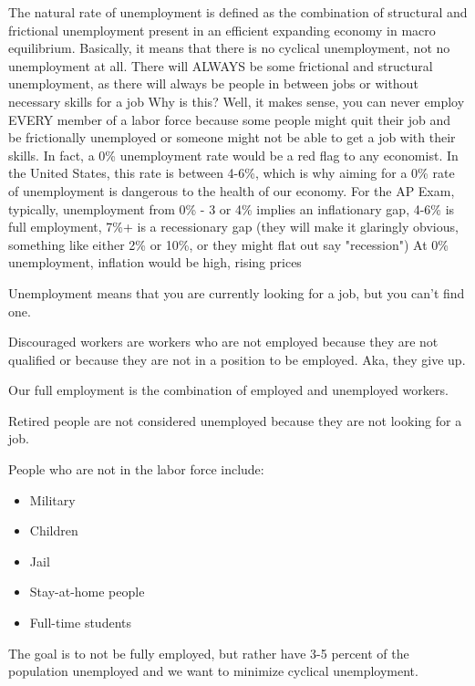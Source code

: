 \documentclass{scrreprt} %
\begin{document}
\begin{remark}

The natural rate of unemployment is defined as the combination of structural and frictional unemployment present in an efficient expanding economy in macro equilibrium.
Basically, it means that there is no cyclical unemployment, not no unemployment at all. There will ALWAYS be some frictional and structural unemployment, as there will always be people in between jobs or without necessary skills for a job
Why is this? Well, it makes sense, you can never employ EVERY member of a labor force because some people might quit their job and be frictionally unemployed or someone might not be able to get a job with their skills. In fact, a 0\% unemployment rate would be a red flag to any economist.
In the United States, this rate is between 4-6\%, which is why aiming for a 0\% rate of unemployment is dangerous to the health of our economy.
For the AP Exam, typically, unemployment from 0\% - 3 or 4\% implies an inflationary gap, 4-6\% is full employment, 7\%+ is a recessionary gap (they will make it glaringly obvious, something like either 2\% or 10\%, or they might flat out say "recession")
At 0\% unemployment, inflation would be high, rising prices

\end{remark}

\begin{definition}
	Unemployment means that you are currently looking for a job, but you can't find one.
\end{definition}

\begin{definition}
	Discouraged workers are workers who are not employed because they are not
	qualified or because they are not in a position to be employed. Aka,
	they give up.
\end{definition}

\begin{definition}
	Our full employment is the combination of employed and unemployed workers.
\end{definition}

\begin{remark}
	Retired people are not considered unemployed because they are not looking for a job.
\end{remark}

People who are not in the labor force include:

\begin{itemize}
	\item Military
	\item Children
	\item Jail
	\item Stay-at-home people
	\item Full-time students
\end{itemize}

\begin{remark}
	The goal is to not be fully employed, but rather have 3-5 percent of the population
	unemployed and we want to minimize cyclical unemployment.
\end{remark}
\end{document}
